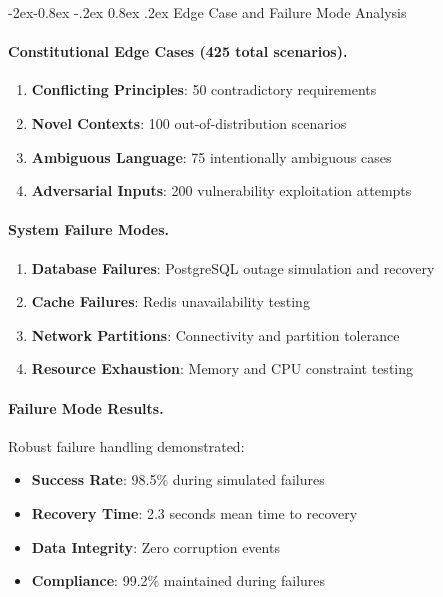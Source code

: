 \documentclass[manuscript,screen,9pt]{acmart}
\makeatletter
\renewcommand\subsubsection{\@startsection{subsubsection}{3}{\z@}%
  {-2ex\@plus -0.8ex \@minus -.2ex}%
  {0.8ex \@plus .2ex}%
  {\normalfont\normalsize\bfseries}}
\makeatother
\begin{document}
\subsubsection{Edge Case and Failure Mode Analysis}
\label{subsubsec:edge_case_analysis}

\paragraph{Constitutional Edge Cases (425 total scenarios).}
\begin{enumerate}[leftmargin=*,itemsep=1pt,parsep=1pt]
	\item \textbf{Conflicting Principles}: 50 contradictory requirements
	\item \textbf{Novel Contexts}: 100 out-of-distribution scenarios
	\item \textbf{Ambiguous Language}: 75 intentionally ambiguous cases
	\item \textbf{Adversarial Inputs}: 200 vulnerability exploitation attempts
\end{enumerate}

\paragraph{System Failure Modes.}
\begin{enumerate}[leftmargin=*,itemsep=1pt,parsep=1pt]
	\item \textbf{Database Failures}: PostgreSQL outage simulation and recovery
	\item \textbf{Cache Failures}: Redis unavailability testing
	\item \textbf{Network Partitions}: Connectivity and partition tolerance
	\item \textbf{Resource Exhaustion}: Memory and CPU constraint testing
\end{enumerate}

\paragraph{Failure Mode Results.}
Robust failure handling demonstrated:
\begin{itemize}[leftmargin=*,itemsep=1pt,parsep=1pt]
	\item \textbf{Success Rate}: 98.5\% during simulated failures
	\item \textbf{Recovery Time}: 2.3 seconds mean time to recovery
	\item \textbf{Data Integrity}: Zero corruption events
	\item \textbf{Compliance}: 99.2\% maintained during failures
\end{itemize}
\end{document}
